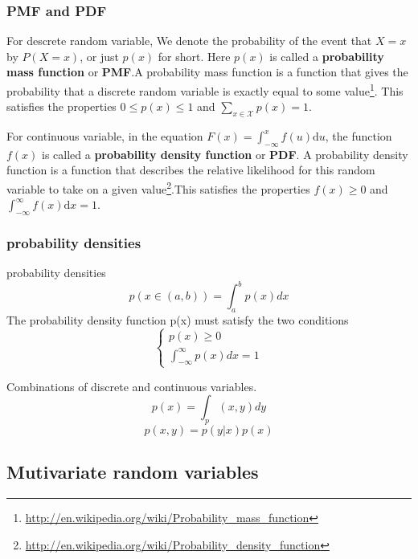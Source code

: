 \subsubsection{PMF and PDF}
For descrete random variable, We denote the probability of the event that $X=x$ by $P(X=x)$, or just $p(x)$ for short. Here $p(x)$ is called a \textbf{probability mass function} or \textbf{PMF}.A probability mass function is a function that gives the probability that a discrete random variable is exactly equal to some value\footnote{\url{http://en.wikipedia.org/wiki/Probability_mass_function}}. This satisfies the properties $0 \leq p(x) \leq 1$ and $\sum_{x \in \mathcal{X}} p(x)=1$.

For continuous variable, in the equation $F(x)=\int_{-\infty}^{x} f(u)\mathrm{d}u$, the function $f(x)$ is called a \textbf{probability density function} or \textbf{PDF}. A probability density function is a function that describes the relative likelihood for this random variable to take on a given value\footnote{\url{http://en.wikipedia.org/wiki/Probability_density_function}}.This satisfies the properties $f(x) \geq 0$ and $\int_{-\infty}^{\infty} f(x)\mathrm{d}x=1$.

\subsubsection{probability densities}
probability densities
\begin{equation}
p(x\in (a,b)) = \int_{a}^{b}p(x)dx
\end{equation}
The probability density function p(x) must satisfy the two conditions
\begin{equation}
\begin{cases}
p(x) \geq 0               \\
\int_{-\infty}^{\infty}p(x)dx = 1
\end{cases}
\end{equation}

Combinations of discrete and continuous variables.
\begin{equation}
p(x) = \int_p(x,y)dy	
\end{equation}
\begin{equation}
p(x,y) = p(y|x)p(x)
\end{equation}



\subsection{Mutivariate random variables}


